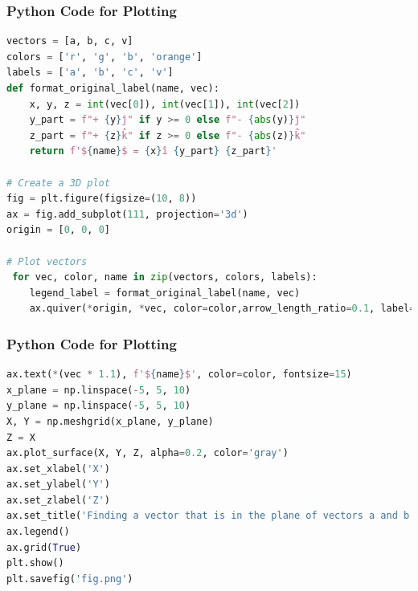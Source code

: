 \documentclass{beamer}
\theoremstyle{remark}
\numberwithin{equation}{section}
\begin{document}
\begin{frame}[fragile]
\frametitle{Python Code for Plotting}
\begin{lstlisting}[language=Python]
vectors = [a, b, c, v]
colors = ['r', 'g', 'b', 'orange']
labels = ['a', 'b', 'c', 'v']
def format_original_label(name, vec):
    x, y, z = int(vec[0]), int(vec[1]), int(vec[2])
    y_part = f"+ {y}ĵ" if y >= 0 else f"- {abs(y)}ĵ"
    z_part = f"+ {z}k̂" if z >= 0 else f"- {abs(z)}k̂"
    return f'${name}$ = {x}î {y_part} {z_part}'

# Create a 3D plot
fig = plt.figure(figsize=(10, 8))
ax = fig.add_subplot(111, projection='3d')
origin = [0, 0, 0]

# Plot vectors
 for vec, color, name in zip(vectors, colors, labels):
    legend_label = format_original_label(name, vec)
    ax.quiver(*origin, *vec, color=color,arrow_length_ratio=0.1, label=legend_label)
\end{lstlisting}
\end{frame}

\begin{frame}[fragile]
\frametitle{Python Code for Plotting}
\begin{lstlisting}[language=Python]
    ax.text(*(vec * 1.1), f'${name}$', color=color, fontsize=15)
x_plane = np.linspace(-5, 5, 10)
y_plane = np.linspace(-5, 5, 10)
X, Y = np.meshgrid(x_plane, y_plane)
Z = X
ax.plot_surface(X, Y, Z, alpha=0.2, color='gray')
ax.set_xlabel('X')
ax.set_ylabel('Y')
ax.set_zlabel('Z')
ax.set_title('Finding a vector that is in the plane of vectors a and b')
ax.legend()
ax.grid(True)
plt.show()
plt.savefig('fig.png')
\end{lstlisting}
\end{frame}
\end{document}
